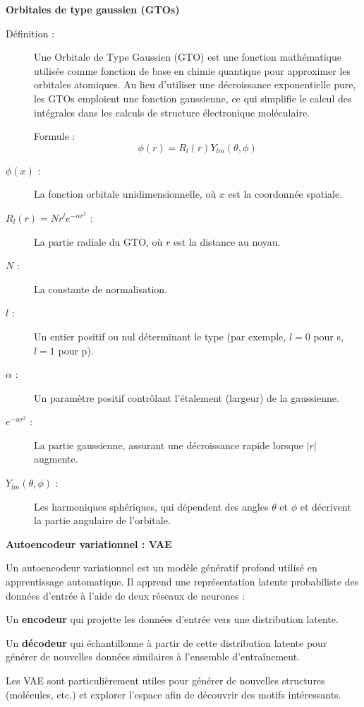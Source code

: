 \noindent \textbf{Orbitales de type gaussien (GTOs)}
\begin{description}
  \item[Définition :] Une Orbitale de Type Gaussien (GTO) est une fonction mathématique utilisée comme fonction de base en chimie quantique pour approximer les orbitales atomiques. Au lieu d'utiliser une décroissance exponentielle pure, les GTOs emploient une fonction gaussienne, ce qui simplifie le calcul des intégrales dans les calculs de structure électronique moléculaire.

  Formule : \[
    \phi(r) = R_{l}(r) Y_{lm}(\theta, \phi)
  \]

  \item[\(\phi(x)\) :] La fonction orbitale unidimensionnelle, où \(x\) est la coordonnée spatiale.
  \item[\( R_{l}(r) = N r^{l} e^{-\alpha r^{2}} \) :] La partie radiale du GTO, où \(r\) est la distance au noyau.
  \item[\(N\) :] La constante de normalisation.
  \item[\(l\) :] Un entier positif ou nul déterminant le type (par exemple, \(l=0\) pour s, \(l=1\) pour p).
  \item[\(\alpha\) :] Un paramètre positif contrôlant l'étalement (largeur) de la gaussienne.
  \item[\(e^{-\alpha r^{2}}\) :] La partie gaussienne, assurant une décroissance rapide lorsque \(|r|\) augmente.
  \item[\(Y_{lm}(\theta, \phi)\) :] Les harmoniques sphériques, qui dépendent des angles \(\theta\) et \(\phi\) et décrivent la partie angulaire de l'orbitale.
\end{description}

\vspace{0.25cm}

\noindent \textbf{Autoencodeur variationnel : VAE}
\begin{description}
  \item[Définition :] Un autoencodeur variationnel est un modèle génératif profond utilisé en apprentissage automatique. Il apprend une représentation latente probabiliste des données d'entrée à l'aide de deux réseaux de neurones :
  \item Un \textbf{encodeur} qui projette les données d'entrée vers une distribution latente.
  \item Un \textbf{décodeur} qui échantillonne à partir de cette distribution latente pour générer de nouvelles données similaires à l'ensemble d'entraînement.

  \item Les VAE sont particulièrement utiles pour générer de nouvelles structures (molécules, etc.) et explorer l'espace afin de découvrir des motifs intéressants.
\end{description}

